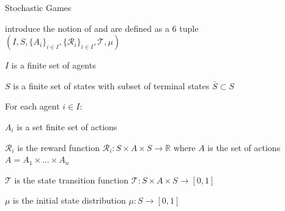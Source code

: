 \begin{frame}{Stochastic Games}

     introduce the notion of  and are defined as a 6 tuple \((I, S, \{A_i\}_{i \in I}, \{\mathcal{R}_i\}_{i \in I}, \mathcal{T}, \mu)\)
    \vspace{10pt}
    \blist
        \item<2-> $I$ is a finite set of agents
        \item<3-> $S$ is a finite set of states with subset of terminal states $\bar{S} \subset S$
        \item<4-> For each agent $i \in I$:
        \blist
            \item $A_i$ is a set finite set of actions
            \item $\mathcal{R}_i$ is the reward function $\mathcal{R}_i : S \times A \times S \to \mathbb{R}$ where $A$ is the set of  actions $A = A_1 \times ... \times A_n$
        \elist
        \item<5-> $\mathcal{T}$ is the state transition function $\mathcal{T}: S \times A \times S \to [0, 1]$
        \item<6-> $\mu$ is the initial state distribution $\mu: S \to [0, 1]$
    \elist

\end{frame}


